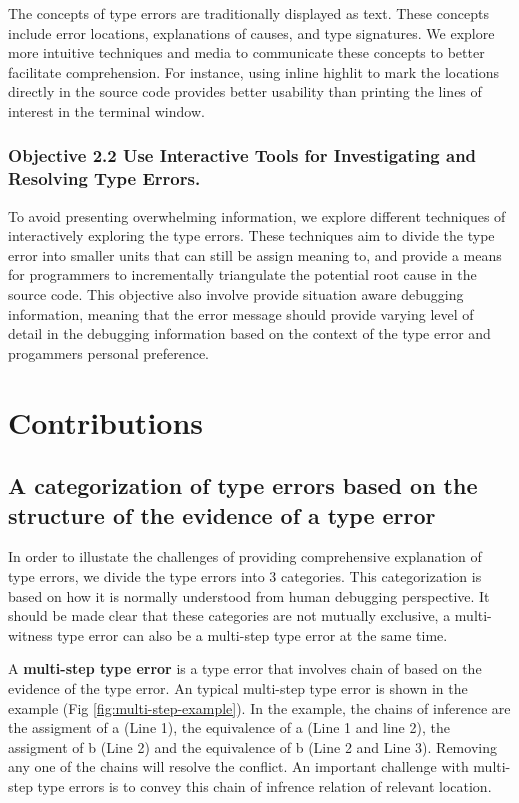 The concepts of type errors are traditionally displayed as text. These concepts include error locations, explanations of causes, and type signatures. We explore more intuitive techniques and media to communicate these concepts to better facilitate comprehension. For instance, using inline highlit to mark the locations directly in the source code provides better usability than printing the lines of interest in the terminal window.

\subsubsection{Objective 2.2 Use Interactive Tools for Investigating and Resolving Type Errors.}

To avoid presenting overwhelming information, we explore different techniques of interactively exploring the type errors. These techniques aim to divide the type error into smaller units that can still be assign meaning to, and provide a means for programmers to incrementally triangulate the potential root cause in the source code. This objective also involve provide situation aware debugging information, meaning that the error message should provide varying level of detail in the debugging information based on the context of the type error and progammers personal preference.


\section{Contributions}

\subsection{A categorization of type errors based on the structure of the evidence of a type error}

In order to illustate the challenges of providing comprehensive explanation of type errors, we divide the type errors into 3 categories. This categorization is based on how it is normally understood from human debugging perspective. It should be made clear that these categories are not mutually exclusive, a multi-witness type error can also be a multi-step type error at the same time.  

A \textbf{multi-step type error} is a type error that involves chain of based on the evidence of the type error. An typical multi-step type error is shown in the example (Fig \ref{fig:multi-step-example}). In the example, the chains of inference are the assigment of a (Line 1), the equivalence of a (Line 1 and line 2), the assigment  of b (Line 2) and the equivalence of b (Line 2 and Line 3). Removing any one of the chains will resolve the conflict. An important challenge with multi-step type errors is to convey this chain of infrence relation of relevant location. 


